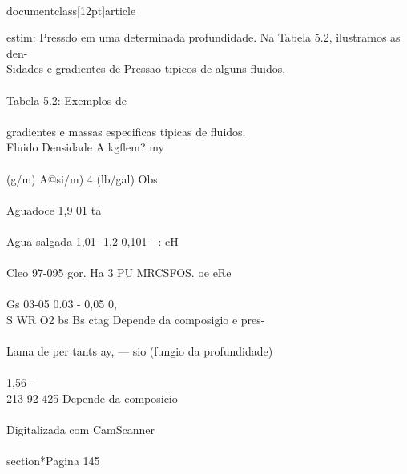 \\documentclass[12pt]{article}
\begin{document}
{estim: Pressdo em uma determinada profundidade. Na Tabela 5.2, ilustramos as den-\\
Sidades e gradientes de Pressao tipicos de alguns fluidos,\\
\\
Tabela 5.2: Exemplos de\\
\\
gradientes e massas especificas tipicas de fluidos.\\
Fluido Densidade A kgflem? my\\
\\
(g/m) A@si/m) 4 (lb/gal) Obs\\
\\
Aguadoce 1,9 01 ta\\
\\
Agua salgada 1,01 -1,2 0,101 - : cH\\
\\
Cleo 97-095 gor. Ha 3 PU MRCSFOS. oe eRe\\
\\
Gs 03-05 0.03 - 0,05 0, \\%
S WR O2 bs Bs ctag Depende da composigio e pres-\\
\\
Lama de per tants ay, — sio (fungio da profundidade)\\
\\
1,56 -\\
213 92-425 Depende da composi¢io\\
\\
Digitalizada com CamScanner\\

\\section*{Pagina 145}

}
\end{document}
